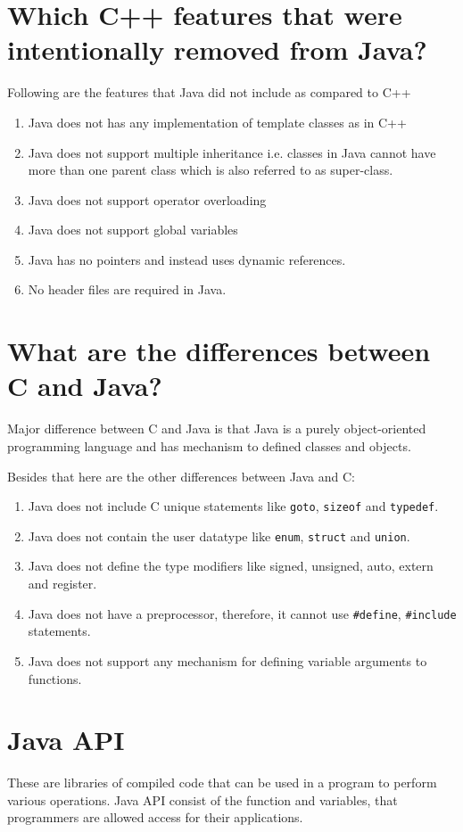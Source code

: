 \documentclass[a4paper, 12pt]{scrarticle}
\begin{document}
\section{Which C++ features that were intentionally removed from Java?}
Following are the features that Java did not include as compared to C++
\begin{enumerate}
  \item Java does not has any implementation of template classes as in C++
  \item Java does not support multiple inheritance i.e. classes in Java cannot have more than one parent class which is also referred to as super-class.
  \item Java does not support operator overloading
  \item Java does not support global variables
  \item Java has no pointers and instead uses dynamic references.
  \item No header files are required in Java.
\end{enumerate}

\section{What are the differences between C and Java?}
Major difference between C and Java is that Java is a purely object-oriented programming language and has mechanism to defined classes and objects.

Besides that here are the other differences between Java and C:
\begin{enumerate}
  \item Java does not include C unique statements like \verb+goto+, \verb+sizeof+ and \verb+typedef+.
  \item Java does not contain the user datatype like \verb+enum+, \verb+struct+ and \verb+union+.
  \item Java does not define the type modifiers like signed, unsigned, auto, extern and register.
  \item Java does not have a preprocessor, therefore, it cannot use \verb+#define+, \verb+#include+ statements.
  \item Java does not support any mechanism for defining variable arguments to functions.
\end{enumerate}

\section{Java API}
These are libraries of compiled code that can be used in a program to perform various operations. Java API consist of the function and variables, that programmers are allowed access for their applications.
\end{document}
